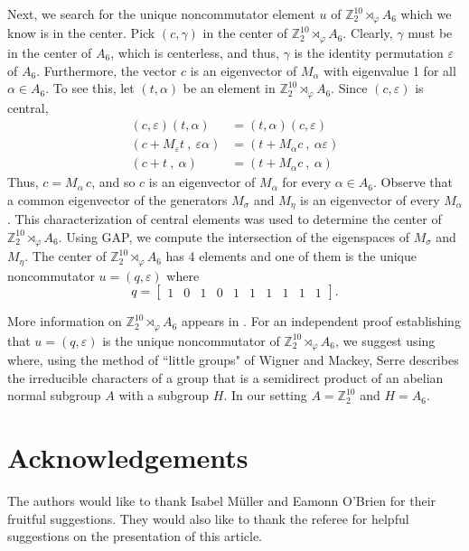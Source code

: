 \documentclass[10pt,leqno]{amsart}
\newcommand{\Z}{\mathbb{Z}}
\begin{document}
Next, we search for the unique noncommutator element $u$ of $\mathbb{Z}_2^{10} \rtimes_\varphi A_6$ which we know is in the center. Pick $(c, \gamma)$ in the center of $\Z_2^{10} \rtimes_\varphi A_6$. Clearly, $\gamma$ must be in the center of $A_6$, which is centerless, and thus, $\gamma$ is the identity permutation $\varepsilon$ of $A_6$. Furthermore, the vector $c$ is an eigenvector of $M_\alpha$ with eigenvalue 1 for all $\alpha \in A_6$. To see this, let $(t,\alpha)$ be an element in $\mathbb{Z}_2^{10} \rtimes_\varphi A_6$. Since $(c, \varepsilon)$ is central,
\begin{align*}
    (c, \varepsilon)(t, \alpha)&=(t, \alpha)(c, \varepsilon)\\
    (c+M_\varepsilon t\ , \ \varepsilon\alpha)&=(t+M_\alpha c\ , \ \alpha\varepsilon)\\
    (c+t\ , \ \alpha)&=(t+M_\alpha c\ , \ \alpha)
\end{align*}
Thus, $c=M_\alpha\, c$, and so $c$ is an eigenvector of $M_\alpha$ for every $\alpha\in A_6$. Observe that a common eigenvector of the generators $M_\sigma$ and $M_\eta$ is an eigenvector of every $M_\alpha$.  This characterization of central elements was used to determine the center of $\mathbb{Z}_2^{10} \rtimes_\varphi A_6$. Using GAP, we compute the intersection of the eigenspaces of $M_\sigma$ and $M_\eta$. The center of $\Z_2^{10}\rtimes_\varphi A_6$ has 4 elements and one of them is the unique noncommutator $u=(q, \varepsilon)$ where  
\[
    q = 
    \begin{bmatrix}
        1 & 0 & 1 & 0 & 1 & 1 & 1 & 1 & 1 & 1
    \end{bmatrix}.
\]

More information on $\mathbb{Z}_2^{10} \rtimes_\varphi A_6$ appears in \cite[Section 5.3.13]{holtplesken}. For an independent proof establishing that $u=(q,\varepsilon)$ is the unique noncommutator of $\Z_2^{10}\rtimes_\varphi A_6$, we suggest using \cite[Proposition 25]{Serre1977} where, using the method of ``little groups" of Wigner and Mackey, Serre describes the irreducible characters of a group that is a semidirect product of an abelian normal subgroup $A$ with a subgroup $H$. In our setting $A=\Z_2^{10}$ and $H=A_6$.

\bigskip

\section*{Acknowledgements}
The authors would like to thank Isabel Müller and Eamonn O'Brien for their fruitful suggestions. They would also like to thank the referee for helpful suggestions on the presentation of this article.



\end{document}
